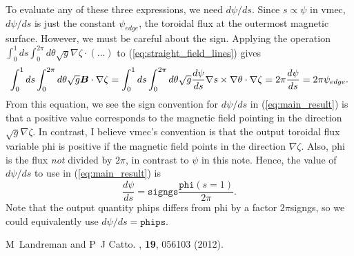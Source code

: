 \documentclass[11pt,letter]{article}
\newcommand{\vect}[1]{\mbox{\boldmath $#1$}}
\newcommand{\vmec}{{\ttfamily vmec}}
\begin{document}
To evaluate any of these three expressions, we need $d\psi/ds$.
Since $s\propto \psi$ in \vmec,
$d\psi/ds$ is just the constant $\psi_{edge}$,
the toroidal flux at the outermost magnetic surface.
However, we must be careful about the sign.
Applying the operation
$ \int_0^1 ds \int_0^{2\pi} d\theta \sqrt{g} \nabla\zeta \cdot (\ldots)$
to (\ref{eq:straight_field_lines}) gives
\begin{equation}
\int_0^1 ds \int_0^{2\pi} d\theta \sqrt{g} \vect{B} \cdot \nabla\zeta
= 
\int_0^1 ds \int_0^{2\pi} d\theta \sqrt{g} 
\frac{d\psi}{ds}  \nabla s \times\nabla \theta \cdot \nabla\zeta
=2 \pi \frac{d\psi}{ds} = 2\pi \psi_{edge}.
\end{equation}
From this equation, we see the sign convention for $d\psi/ds$ in (\ref{eq:main_result})
is that a positive value corresponds to the magnetic field pointing in the direction
$\sqrt{g} \nabla\zeta$.
In contrast, I believe \vmec's convention is that the output toroidal flux variable {\ttfamily phi}
is positive if the magnetic field points in the direction
$\nabla\zeta$. Also, {\ttfamily phi} is the flux \emph{not} divided by $2\pi$, in contrast to $\psi$ in this note.
Hence, the value of $d\psi/ds$ to use in (\ref{eq:main_result}) is
\begin{equation}
\frac{d\psi}{ds} = \mathtt{signgs}\frac{\mathtt{phi}(s=1)}{2\pi}.
\end{equation}
Note that the output quantity {\ttfamily phips} differs from {\ttfamily phi}
by a factor $2\pi${\ttfamily signgs}, so we could equivalently use $d\psi/ds = \mathtt{phips}$.


%
%

\begin{thebibliography}{1}

M~Landreman and P~J Catto.
, {\bf 19}, 056103 (2012).

\end{thebibliography}
\end{document}
